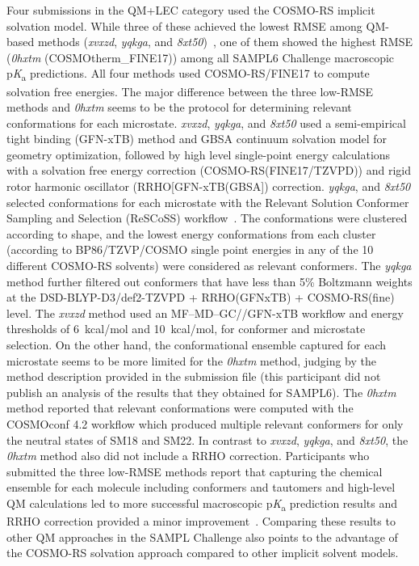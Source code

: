 \documentclass[9pt,lineno,final]{elife}
\newcommand{\pKa}{p\textit{K}\textsubscript{a}}
\begin{document}
Four submissions in the QM+LEC category used the COSMO-RS implicit solvation model. 
While three of these achieved the lowest RMSE among QM-based methods (\textit{xvxzd}, \textit{yqkga}, and \textit{8xt50})~\citep{Pracht:2018:J.Comput.AidedMol.Des.}, one of them showed the highest RMSE (\textit{0hxtm} (COSMOtherm\_FINE17)) among all SAMPL6 Challenge macroscopic \pKa{} predictions. 
All four methods used COSMO-RS/FINE17 to compute solvation free energies. 
The major difference between the three low-RMSE methods and \textit{0hxtm} seems to be the protocol for determining relevant conformations for each microstate. 
\textit{xvxzd}, \textit{yqkga}, and \textit{8xt50} used a semi-empirical tight binding (GFN-xTB) method and GBSA continuum solvation model for geometry optimization, followed by high level single-point energy calculations with a solvation free energy correction (COSMO-RS(FINE17/TZVPD)) and rigid rotor harmonic oscillator (RRHO[GFN-xTB(GBSA]) correction. 
\textit{yqkga}, and \textit{8xt50} selected  conformations for each microstate with the Relevant Solution Conformer Sampling and Selection (ReSCoSS) workflow~\citep{Pracht:2018:J.Comput.AidedMol.Des.}. 
The conformations were clustered according to shape, and the lowest energy conformations from each cluster (according to BP86/TZVP/COSMO single point energies in any of the 10 different COSMO-RS solvents) were considered as relevant conformers. 
The \textit{yqkga} method further filtered out conformers that have less than 5\% Boltzmann weights at the DSD-BLYP-D3/def2-TZVPD + RRHO(GFNxTB) + COSMO-RS(fine) level.
The \textit{xvxzd} method used an MF–MD–GC//GFN-xTB workflow and energy thresholds of 6~kcal/mol and 10~kcal/mol, for conformer and microstate selection.
On the other hand, the conformational ensemble captured for each microstate seems to be more limited for the \textit{0hxtm} method, judging by the method description provided in the submission file (this participant did not publish an analysis of the results that they obtained for SAMPL6). 
The \textit{0hxtm} method reported that relevant conformations were computed with the COSMOconf 4.2 workflow which produced multiple relevant conformers for only the neutral states of SM18 and SM22.  
In contrast to \textit{xvxzd}, \textit{yqkga}, and \textit{8xt50}, the \textit{0hxtm} method also did not include a RRHO correction.
Participants who submitted the three low-RMSE methods report that capturing the chemical ensemble for each molecule including conformers and tautomers and high-level QM calculations led to more successful macroscopic \pKa{} prediction results and RRHO correction provided a minor improvement~\citep{Pracht:2018:J.Comput.AidedMol.Des.}. 
Comparing these results to other QM approaches in the SAMPL Challenge also points to the advantage of the COSMO-RS solvation approach compared to other implicit solvent models.
\end{document}
